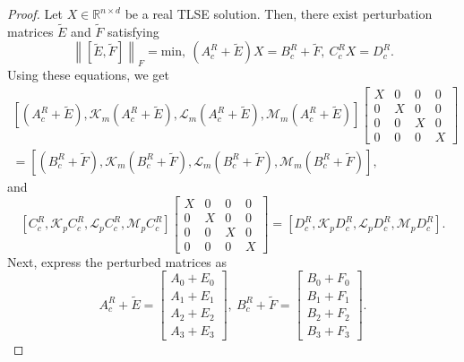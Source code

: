 \documentclass[10pt,a4paper]{amsart}
\def \R{{\mathbb R}}
\newcommand\norm[1]{\left\lVert#1\right\rVert}
\begin{document}
\begin{proof}
	Let $X \in \R^{n \times d}$ be a real TLSE solution. Then, there exist perturbation matrices $\widetilde{E}$ and $\widetilde{F}$ satisfying
	\begin{equation*}
		\norm{[\widetilde{E}, \widetilde{F}]}_F= \textrm{min}, ~	(A^R_c+ \widetilde{E})X= B^R_c+ \widetilde{F}, ~ C^R_cX=D^R_c.
	\end{equation*}
	Using these equations, we get
	\begin{align}\label{eq3.5}
		\left[(A^R_c+ \widetilde{E}), \mathcal{K}_m (A^R_c+ \widetilde{E}), \mathcal{L}_m (A^R_c+ \widetilde{E}), \mathcal{M}_m (A^R_c+ \widetilde{E})\right]
		\begin{bmatrix}
			X & 0 & 0 & 0 \\
			0 & X & 0 & 0 \\
			0 & 0 & X & 0 \\
			0 & 0 & 0 & X
		\end{bmatrix} \nonumber &\\= \left[(B^R_c+ \widetilde{F}), \mathcal{K}_m (B^R_c+ \widetilde{F}), \mathcal{L}_m (B^R_c+ \widetilde{F}), \mathcal{M}_m (B^R_c+ \widetilde{F}) \right],
	\end{align}
and
	\begin{equation}\label{eq3.51}
		\left[C^R_c, \mathcal{K}_p C^R_c, \mathcal{L}_p C^R_c, \mathcal{M}_p C^R_c\right]	\begin{bmatrix}
			X & 0 & 0 & 0 \\
			0 & X & 0 & 0 \\
			0 & 0 & X & 0 \\
			0 & 0 & 0 & X
		\end{bmatrix} = \left[D^R_c, \mathcal{K}_p D^R_c, \mathcal{L}_p D^R_c, \mathcal{M}_p D^R_c\right].
	\end{equation}
Next, express the perturbed matrices as
	\begin{equation}\label{eq3.6}
		A^R_c + \widetilde{E}= 
		\begin{bmatrix}
			A_{0}+ E_{0} \\
			A_{1}+ E_{1} \\
			A_{2}+ E_{2} \\
			A_{3}+ E_{3} 
		\end{bmatrix}, ~ B^R_c+\widetilde{F}= 
		\begin{bmatrix}
			B_0+ F_0 \\
			B_1+ F_1  \\
			B_2+ F_2 \\
			B_3+ F_3
		\end{bmatrix}.

\end{equation}
\end{proof}
\end{document}
